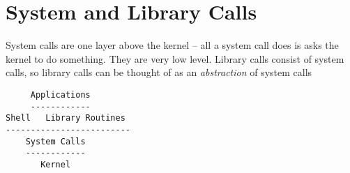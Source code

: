
\section{System and Library Calls}

System calls are one layer above the kernel -- all a system call does is asks
the kernel to do something. They are very low level. Library calls consist of
system calls, so library calls can be thought of as an \textit{abstraction} of
system calls

\begin{verbatim}
     Applications
     ------------
Shell   Library Routines
-------------------------
    System Calls
    ------------
       Kernel
\end{verbatim}

